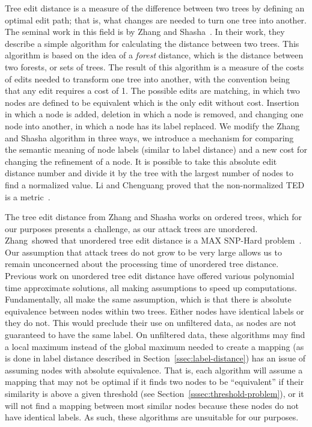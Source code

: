 Tree edit distance is a measure of the difference between two trees by defining an optimal edit path; that is, what changes are needed to turn one tree into another. The seminal work in this field is by Zhang and Shasha~\cite{Zhang_Shasha_1989}. In their work, they describe a simple algorithm for calculating the distance between two trees. This algorithm is based on the idea of a \textit{forest} distance, which is the distance between two forests, or sets of trees. The result of this algorithm is a measure of the costs of edits needed to transform one tree into another, with the convention being that any edit requires a cost of 1. The possible edits are matching, in which two nodes are defined to be equivalent which is the only edit without cost. Insertion in which a node is added, deletion in which a node is removed, and changing one node into another, in which a node has its label replaced. We modify the Zhang and Shasha algorithm in three ways, we introduce a mechanism for comparing the semantic meaning of node labels (similar to label distance) and  a new cost for changing the refinement of a node. It is possible to take this absolute edit distance number and divide it by the tree with the largest number of nodes to find a normalized value. Li and Chenguang proved that the non-normalized TED is a metric~\cite{li2011metric}.

The tree edit distance from Zhang and Shasha works on ordered trees, which for our purposes presents a challenge, as our attack trees are unordered. Zhang~\etal showed that unordered tree edit distance is a MAX SNP-Hard problem~\cite{zhang_max_1994}. Our assumption that attack trees do not grow to be very large allows us to remain unconcerned about the processing time of unordered tree distance. Previous work on unordered tree edit distance have offered various polynomial time approximate solutions, all making assumptions to speed up computations. Fundamentally, all make the same assumption, which is that there is absolute equivalence between nodes within two trees. Either nodes have identical labels or they do not. This would preclude their use on unfiltered data, as nodes are not guaranteed to have the same label. On unfiltered data, these algorithms may find a local maximum instead of the global maximum needed to create a mapping (as is done in label distance described in Section~\ref{ssec:label-distance}) has an issue of assuming nodes with absolute equivalence. That is, each algorithm will assume a mapping that may not be optimal if it finds two nodes to be ``equivalent'' if their similarity is above a given threshold (see Section~\ref{sssec:threshold-problem}), or it will not find a mapping between most similar nodes because these nodes do not have identical labels. As such, these algorithms are unsuitable for our purposes.


